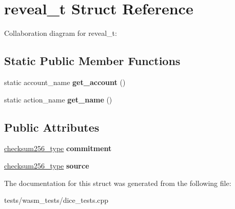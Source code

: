 \hypertarget{structreveal__t}{}\section{reveal\+\_\+t Struct Reference}
\label{structreveal__t}


Collaboration diagram for reveal\+\_\+t\+:
\subsection*{Static Public Member Functions}
\begin{DoxyCompactItemize}
\item 
\mbox{\label{structreveal__t_af93fb41f1d35a73190e452246fcc8c78}} 
static account\+\_\+name {\bfseries get\+\_\+account} ()
\item 
\mbox{\label{structreveal__t_a63701a30769741ada4e6e7ff01aca77f}} 
static action\+\_\+name {\bfseries get\+\_\+name} ()
\end{DoxyCompactItemize}
\subsection*{Public Attributes}
\begin{DoxyCompactItemize}
\item 
\mbox{\label{structreveal__t_a6f6ed5b4531cee335ddbac3d979b400f}} 
\mbox{\hyperlink{classfc_1_1sha256}{checksum256\+\_\+type}} {\bfseries commitment}
\item 
\mbox{\label{structreveal__t_a051dacd611a3af5cb39b8f2f76c2f25c}} 
\mbox{\hyperlink{classfc_1_1sha256}{checksum256\+\_\+type}} {\bfseries source}
\end{DoxyCompactItemize}


The documentation for this struct was generated from the following file\+:\begin{DoxyCompactItemize}
\item 
tests/wasm\+\_\+tests/dice\+\_\+tests.\+cpp\end{DoxyCompactItemize}
